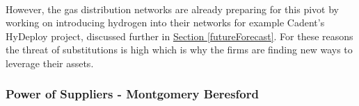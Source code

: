 \documentclass[11pt]{article}		%
\newcommand{\supercite}[1]{\textsuperscript{\cite{#1}}}		%
\newcommand{\sectref}[1]{\hyperref[#1]{Section \ref*{#1}}}     %
\begin{document}
                \\ 
                \hspace*{2ex}However, the gas distribution networks are already preparing for this pivot by working on introducing hydrogen into their networks for example Cadent’s HyDeploy project, discussed further in \sectref{futureForecast}. 
                For these reasons the threat of substitutions is high which is why the firms are finding new ways to leverage their assets.%

     
		\subsubsection[Power of Suppliers]{Power of Suppliers - Montgomery Beresford}
		         
\end{document}
